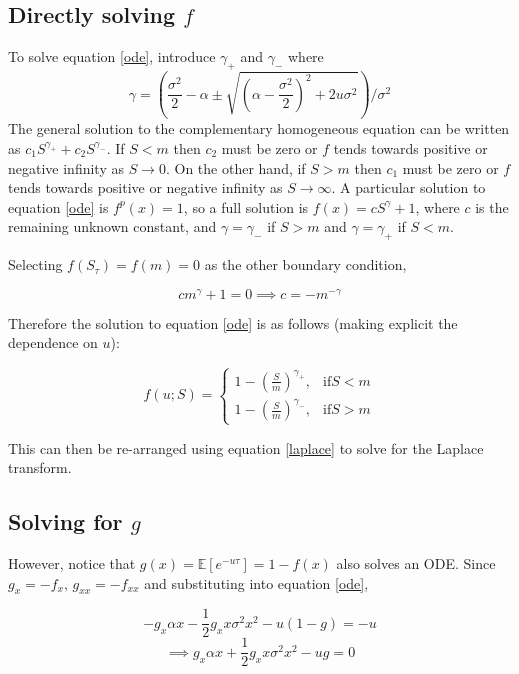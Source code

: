 \documentclass[12pt]{article}
\begin{document}
\subsection{Directly solving \(f\)}

To solve equation \ref{ode}, introduce \(\gamma_+\) and \(\gamma_{-}\) where \[\gamma =  \left(\frac{\sigma^2}{2}-\alpha  \pm \sqrt{\left(\alpha -\frac{\sigma^2}{2}\right)^2+2u\sigma^2}\right)/\sigma^2\]
The general solution to the complementary homogeneous equation can be written as \(c_1 S ^ {\gamma_+}+c_2 S^{\gamma_{-}}\).   If \(S<m\) then \(c_2\) must be zero or \(f\) tends towards positive or negative infinity as \(S \to 0\).  On the other hand, if \(S>m\) then \(c_1\) must be zero or \(f\) tends towards positive or negative infinity as \(S \to \infty\). A particular solution to equation \ref{ode} is \(f^p(x)=1\), so a full solution is \(f(x)=c S ^ \gamma +1\), where \(c\) is the remaining unknown constant, and \(\gamma = \gamma_{-}\) if \(S>m\) and \(\gamma= \gamma_{+}\) if \(S<m\).

Selecting \(f(S_\tau)=f(m)=0\) as the other boundary condition,

\[c m^{\gamma}+1=0 \implies c = -m^{-\gamma}\]

Therefore the solution to equation \ref{ode} is as follows (making explicit the dependence on \(u\)):

\begin{equation}
f(u; S)=\left\{
\begin{array}{rl}
1-\left(\frac{S}{m} \right) ^ {\gamma_{+}} , & \mathrm{if}  S<m \\
1-\left(\frac{S}{m} \right) ^ {\gamma_{-}}, & \mathrm{if} S>m
\end{array}
\right.
\end{equation}

This can then be re-arranged using equation \ref{laplace} to solve for the Laplace transform.

\subsection{Solving for \(g\)}\label{homogenous}

However, notice that \(g(x)=\mathbb{E}\left[e^{-u\tau}\right]=1-f(x)\) also solves an ODE.  Since \(g_x=-f_x,\,g_{xx}=-f_{xx}\) and substituting into equation \ref{ode}, 

\[-g_x\alpha x -\frac{1}{2} g_xx \sigma^2 x^2-u(1-g)=-u\]
\[\implies g_x \alpha x + \frac{1}{2} g_xx \sigma^2 x^2-ug=0\]
\end{document}
